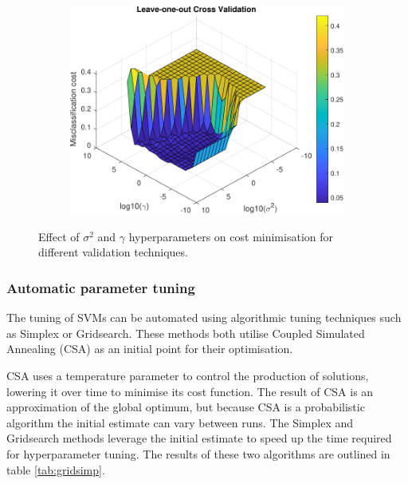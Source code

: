 \documentclass{article}
\begin{document}
\begin{figure}[h]
\begin{subfigure}[b]{0.45\textwidth}
                \caption{}
                 \label{fig:10_fold_validation}
             \end{subfigure}
             \hfill
             \begin{subfigure}[b]{0.45\textwidth}
                 \centering
                 \includegraphics[width=\textwidth]{Assignment 1/figures/loo_cross_validation_surf.pdf}
                \caption{}
                 \label{fig:loo_validation}
             \end{subfigure}
            \caption{Effect of $\sigma^2$ and $\gamma$ hyperparameters on cost minimisation for different validation techniques. }
        \end{figure}
            
            
        \subsubsection{Automatic parameter tuning}
            The tuning of SVMs can be automated using algorithmic tuning techniques such as Simplex or Gridsearch. These methods both utilise Coupled Simulated Annealing (CSA) as an initial point for their optimisation. 
            
            CSA uses a temperature parameter to control the production of solutions, lowering it over time to minimise its cost function. The result of CSA is an approximation of the global optimum, but because CSA is a probabilistic algorithm the initial estimate can vary between runs. The Simplex and Gridsearch methods leverage the initial estimate to speed up the time required for hyperparameter tuning. The results of these two algorithms are outlined in table \ref{tab:gridsimp}. 
            
\end{document}

